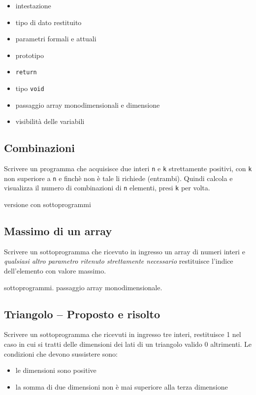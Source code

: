 \begin{itemize}
\item intestazione
\item tipo di dato restituito
\item parametri formali e attuali
\item prototipo 
\item \texttt{return}
\item tipo \texttt{void}
\item passaggio array monodimensionali e dimensione
\item visibilit\`a delle variabili
\end{itemize}

\subsection{Combinazioni}
Scrivere un programma che acquisisce due interi \texttt{n} e \texttt{k} strettamente positivi, con \texttt{k} non superiore a  \texttt{n} e finch\`e non \`e tale li richiede (entrambi). Quindi calcola e visualizza il numero di combinazioni di \texttt{n} elementi, presi \texttt{k} per volta.



versione con sottoprogrammi





\subsection{Massimo di un array} 
Scrivere un sottoprogramma che ricevuto in ingresso un array di numeri interi e \textit{qualsiasi altro parametro ritenuto strettamente necessario} restituisce l'indice dell'elemento con valore massimo.

\begin{tags}
sottoprogrammi. passaggio array monodimensionale.
\end{tags}




\subsection{Triangolo -- Proposto e risolto} 
Scrivere un sottoprogramma che ricevuti in ingresso tre interi, restituisce 1 nel caso in cui si tratti delle dimensioni dei lati di un triangolo valido 0 altrimenti. Le condizioni che devono sussistere sono:\begin{itemize}
\item le dimensioni sono positive
\item la somma di due dimensioni non \`e mai superiore alla terza dimensione
\end{itemize}



